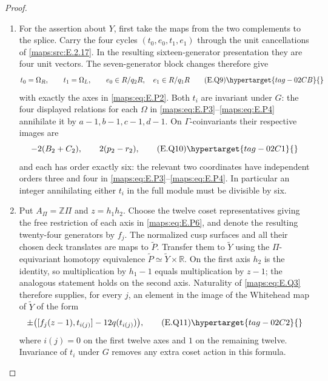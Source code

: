 \begin{proof}
\begin{enumerate}[label={$\langle1\rangle$\arabic*.},leftmargin=*]
\item For the assertion about $Y$, first take the maps from the two complements to the splice.  Carry the four cycles $(t_0,e_0,t_1,e_1)$ through the unit
cancellations of \ref{maps:src:E.2.17}. In the resulting
sixteen-generator presentation they are four unit vectors.  The seven-generator block changes therefore give
\[
 t_0=\Omega_R,\qquad t_1=\Omega_L,
 \qquad e_0\in R/q_2R,\quad e_1\in R/q_1R
 \tag{E.Q9}\hypertarget{tag-02CB}{}\label{maps:eq:E.Q9}
\]
with exactly the axes in \eqref{maps:eq:E.P2}.  
Both $t_i$ are invariant under $G$: the four displayed
relations for each $\Omega$ in \eqref{maps:eq:E.P3}--\eqref{maps:eq:E.P4} annihilate
it by $a-1,b-1,c-1,d-1$.  On $\Gamma$-coinvariants
their respective images are
\[
 -2(B_2+C_2),\qquad 2(p_2-r_2),
 \tag{E.Q10}\hypertarget{tag-02C1}{}\label{maps:eq:E.Q10}
\]
and each has order exactly six: the relevant two coordinates
have independent orders three and four in \eqref{maps:eq:E.P3}--\eqref{maps:eq:E.P4}.
In particular an integer annihilating either $t_i$ in the
full module must be divisible by six.

\item Put $A_\Pi=\mathbb Z\Pi$ and $z=h_1h_2$.  Choose the twelve
coset representatives giving the free restriction of each
axis in \eqref{maps:eq:E.P6}, and denote the resulting twenty-four generators
by $f_j$.  The normalized cusp surfaces and all their chosen
deck translates are maps to $\widetilde P$.  Transfer
them to $\widetilde Y$ using the $\Pi$-equivariant homotopy
equivalence $\widetilde P\simeq\widetilde Y\times\mathbb R$.
On the first axis $h_2$ is the identity, so multiplication
by $h_1-1$ equals multiplication by $z-1$; the analogous
statement holds on the second axis.  Naturality of \eqref{maps:eq:E.Q3}
therefore supplies, for every $j$, an element in the image
of the Whitehead map of $\widetilde Y$ of the form
\[
 \pm\bigl([f_j(z-1),t_{i(j)}]-12q(t_{i(j)})\bigr),
 \tag{E.Q11}\hypertarget{tag-02C2}{}\label{maps:eq:E.Q11}
\]
where $i(j)=0$ on the first twelve axes and $1$ on the
remaining twelve.  Invariance of $t_i$ under $G$ removes
any extra coset action in this formula.


\end{enumerate}
\end{proof}
